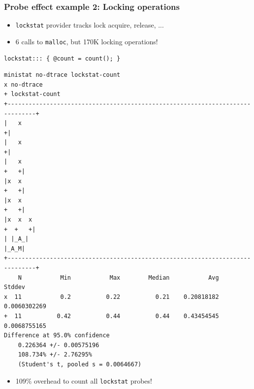 \begin{frame}[fragile]
  \frametitle{Probe effect example 2: Locking operations}

  \begin{itemize}
    \item \texttt{lockstat} provider tracks lock acquire, release, ...
    \item 6 calls to \texttt{malloc}, but 170K locking operations!
  \end{itemize}

  \begin{small}
    \begin{verbatim}
lockstat::: { @count = count(); }
\end{verbatim}
  \end{small}

  \pause

  \begin{center}
    \begin{tiny}
\begin{verbatim}
ministat no-dtrace lockstat-count
x no-dtrace
+ lockstat-count
+------------------------------------------------------------------------------+
|   x                                                                         +|
|   x                                                                         +|
|   x                                                                     +   +|
|x  x                                                                     +   +|
|x  x                                                                     +   +|
|x  x  x                                                               +  +   +|
| |_A_|                                                                   |_A_M|
+------------------------------------------------------------------------------+
    N           Min           Max        Median           Avg        Stddev
x  11           0.2          0.22          0.21    0.20818182  0.0060302269
+  11          0.42          0.44          0.44    0.43454545  0.0068755165
Difference at 95.0% confidence
	0.226364 +/- 0.00575196
	108.734% +/- 2.76295%
	(Student's t, pooled s = 0.0064667)
\end{verbatim}
    \end{tiny}
  \end{center}

  \begin{itemize}
    \item 109\% overhead to count all \texttt{lockstat} probes!
  \end{itemize}
\end{frame}


